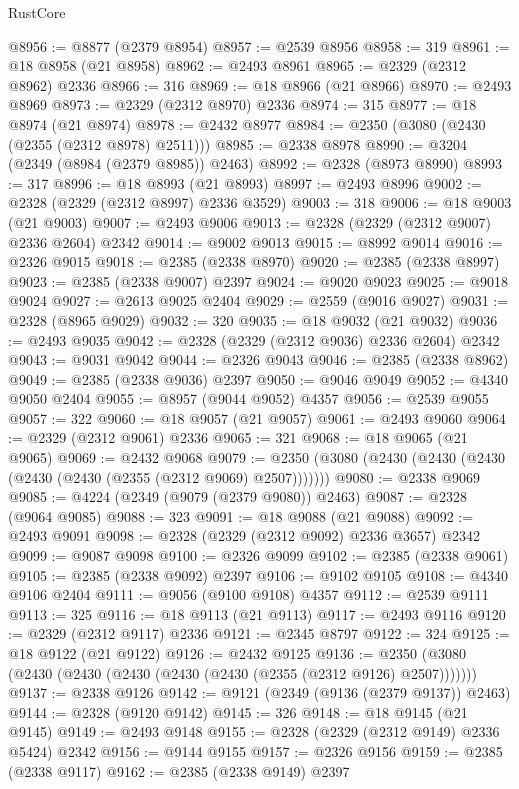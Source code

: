\begin{lexlean}{RustCore}
\begin{coremodule}
@8956 := @8877 (@2379 @8954)
@8957 := @2539 @8956
@8958 := 319
@8961 := @18 @8958 (@21 @8958)
@8962 := @2493 @8961
@8965 := @2329 (@2312 @8962) @2336
@8966 := 316
@8969 := @18 @8966 (@21 @8966)
@8970 := @2493 @8969
@8973 := @2329 (@2312 @8970) @2336
@8974 := 315
@8977 := @18 @8974 (@21 @8974)
@8978 := @2432 @8977
@8984 := @2350 (@3080 (@2430 (@2355 (@2312 @8978) @2511)))
@8985 := @2338 @8978
@8990 := @3204 (@2349 (@8984 (@2379 @8985)) @2463)
@8992 := @2328 (@8973 @8990)
@8993 := 317
@8996 := @18 @8993 (@21 @8993)
@8997 := @2493 @8996
@9002 := @2328 (@2329 (@2312 @8997) @2336 @3529)
@9003 := 318
@9006 := @18 @9003 (@21 @9003)
@9007 := @2493 @9006
@9013 := @2328 (@2329 (@2312 @9007) @2336 @2604) @2342
@9014 := @9002 @9013
@9015 := @8992 @9014
@9016 := @2326 @9015
@9018 := @2385 (@2338 @8970)
@9020 := @2385 (@2338 @8997)
@9023 := @2385 (@2338 @9007) @2397
@9024 := @9020 @9023
@9025 := @9018 @9024
@9027 := @2613 @9025 @2404
@9029 := @2559 (@9016 @9027)
@9031 := @2328 (@8965 @9029)
@9032 := 320
@9035 := @18 @9032 (@21 @9032)
@9036 := @2493 @9035
@9042 := @2328 (@2329 (@2312 @9036) @2336 @2604) @2342
@9043 := @9031 @9042
@9044 := @2326 @9043
@9046 := @2385 (@2338 @8962)
@9049 := @2385 (@2338 @9036) @2397
@9050 := @9046 @9049
@9052 := @4340 @9050 @2404
@9055 := @8957 (@9044 @9052) @4357
@9056 := @2539 @9055
@9057 := 322
@9060 := @18 @9057 (@21 @9057)
@9061 := @2493 @9060
@9064 := @2329 (@2312 @9061) @2336
@9065 := 321
@9068 := @18 @9065 (@21 @9065)
@9069 := @2432 @9068
@9079 := @2350 (@3080 (@2430 (@2430 (@2430 (@2430 (@2430 (@2355 (@2312 @9069) @2507)))))))
@9080 := @2338 @9069
@9085 := @4224 (@2349 (@9079 (@2379 @9080)) @2463)
@9087 := @2328 (@9064 @9085)
@9088 := 323
@9091 := @18 @9088 (@21 @9088)
@9092 := @2493 @9091
@9098 := @2328 (@2329 (@2312 @9092) @2336 @3657) @2342
@9099 := @9087 @9098
@9100 := @2326 @9099
@9102 := @2385 (@2338 @9061)
@9105 := @2385 (@2338 @9092) @2397
@9106 := @9102 @9105
@9108 := @4340 @9106 @2404
@9111 := @9056 (@9100 @9108) @4357
@9112 := @2539 @9111
@9113 := 325
@9116 := @18 @9113 (@21 @9113)
@9117 := @2493 @9116
@9120 := @2329 (@2312 @9117) @2336
@9121 := @2345 @8797
@9122 := 324
@9125 := @18 @9122 (@21 @9122)
@9126 := @2432 @9125
@9136 := @2350 (@3080 (@2430 (@2430 (@2430 (@2430 (@2430 (@2355 (@2312 @9126) @2507)))))))
@9137 := @2338 @9126
@9142 := @9121 (@2349 (@9136 (@2379 @9137)) @2463)
@9144 := @2328 (@9120 @9142)
@9145 := 326
@9148 := @18 @9145 (@21 @9145)
@9149 := @2493 @9148
@9155 := @2328 (@2329 (@2312 @9149) @2336 @5424) @2342
@9156 := @9144 @9155
@9157 := @2326 @9156
@9159 := @2385 (@2338 @9117)
@9162 := @2385 (@2338 @9149) @2397

\end{coremodule}
\end{lexlean}
